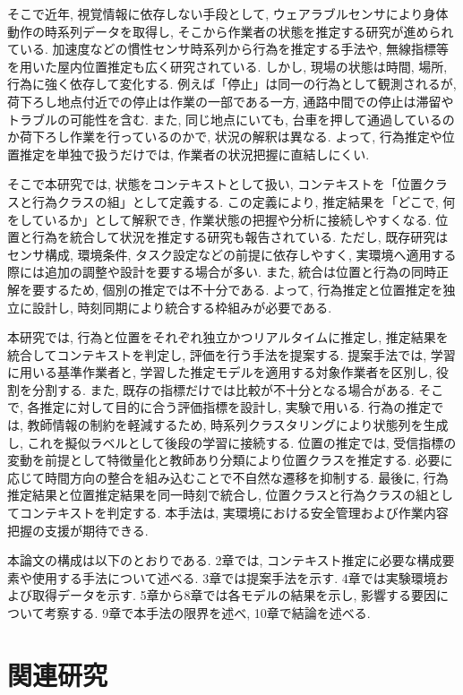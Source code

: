 \documentclass[a4paper,12pt]{jreport}
\begin{document}
そこで近年, 視覚情報に依存しない手段として, ウェアラブルセンサにより身体動作の時系列データを取得し, そこから作業者の状態を推定する研究が進められている. 加速度などの慣性センサ時系列から行為を推定する手法や, 無線指標等を用いた屋内位置推定も広く研究されている.
しかし, 現場の状態は時間, 場所, 行為に強く依存して変化する. 例えば「停止」は同一の行為として観測されるが, 荷下ろし地点付近での停止は作業の一部である一方, 通路中間での停止は滞留やトラブルの可能性を含む. また, 同じ地点にいても, 台車を押して通過しているのか荷下ろし作業を行っているのかで, 状況の解釈は異なる. よって, 行為推定や位置推定を単独で扱うだけでは, 作業者の状況把握に直結しにくい.

そこで本研究では, 状態をコンテキストとして扱い, コンテキストを「位置クラスと行為クラスの組」として定義する. この定義により, 推定結果を「どこで, 何をしているか」として解釈でき, 作業状態の把握や分析に接続しやすくなる.
位置と行為を統合して状況を推定する研究も報告されている. ただし, 既存研究はセンサ構成, 環境条件, タスク設定などの前提に依存しやすく, 実環境へ適用する際には追加の調整や設計を要する場合が多い. また, 統合は位置と行為の同時正解を要するため, 個別の推定では不十分である. よって, 行為推定と位置推定を独立に設計し, 時刻同期により統合する枠組みが必要である.

本研究では, 行為と位置をそれぞれ独立かつリアルタイムに推定し, 推定結果を統合してコンテキストを判定し, 評価を行う手法を提案する. 提案手法では, 学習に用いる基準作業者と, 学習した推定モデルを適用する対象作業者を区別し, 役割を分割する. また, 既存の指標だけでは比較が不十分となる場合がある. そこで, 各推定に対して目的に合う評価指標を設計し, 実験で用いる.
行為の推定では, 教師情報の制約を軽減するため, 時系列クラスタリングにより状態列を生成し, これを擬似ラベルとして後段の学習に接続する. 位置の推定では, 受信指標の変動を前提として特徴量化と教師あり分類により位置クラスを推定する. 必要に応じて時間方向の整合を組み込むことで不自然な遷移を抑制する. 最後に, 行為推定結果と位置推定結果を同一時刻で統合し, 位置クラスと行為クラスの組としてコンテキストを判定する. 本手法は, 実環境における安全管理および作業内容把握の支援が期待できる.

本論文の構成は以下のとおりである. 2章では, コンテキスト推定に必要な構成要素や使用する手法について述べる. 3章では提案手法を示す. 4章では実験環境および取得データを示す. 5章から8章では各モデルの結果を示し, 影響する要因について考察する. 9章で本手法の限界を述べ, 10章で結論を述べる.


\chapter{関連研究}
\end{document}
